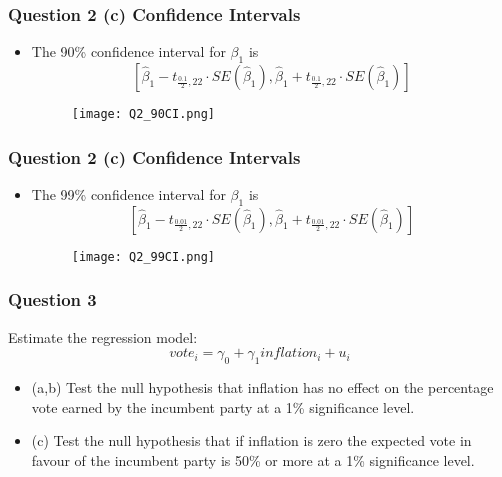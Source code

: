 \documentclass[11pt, xcolor=x11names,compress]{beamer}
\begin{document}
\begin{frame}[fragile,t]
\frametitle{Question 2 (c) Confidence Intervals} 
\linespread{1.15}
\begin{itemize}
    \item The 90\% confidence interval for  $\beta_1$ is
$$
\left[\widehat{\beta}_{1} - t_{\frac{0.1}{2}, 22} \cdot S E\left(\widehat{\beta}_{1}\right),\widehat{\beta}_{1} + t_{\frac{0.1}{2}, 22} \cdot SE\left(\widehat{\beta}_{1}\right)\right]
$$
\begin{figure}
    \centering
    \texttt{[image: Q2\_90CI.png]}
\end{figure}
\end{itemize}
\end{frame}

\begin{frame}[fragile,t]
\frametitle{Question 2 (c) Confidence Intervals} 
\linespread{1.15}
\begin{itemize}
    \item The 99\% confidence interval for  $\beta_1$ is
$$
\left[\widehat{\beta}_{1} - t_{\frac{0.01}{2}, 22} \cdot S E\left(\widehat{\beta}_{1}\right),\widehat{\beta}_{1} + t_{\frac{0.01}{2}, 22} \cdot SE\left(\widehat{\beta}_{1}\right)\right]
$$
\begin{figure}
    \centering
    \texttt{[image: Q2\_99CI.png]}
\end{figure}
\end{itemize}
\end{frame}

\begin{frame}[fragile,t]
\frametitle{Question 3}
Estimate the regression model:
$$
vote_i = \gamma_0 + \gamma_1 inflation_i + u_i
$$

\begin{itemize}
    \item (a,b) Test the null hypothesis that inflation has no effect on the percentage vote earned by the incumbent party at a 1\% significance level.
    \item (c) Test the null hypothesis that if inflation is zero the expected vote in favour of the incumbent party is 50\% or more at a 1\% significance level.
\end{itemize}
\end{frame}
\end{document}

